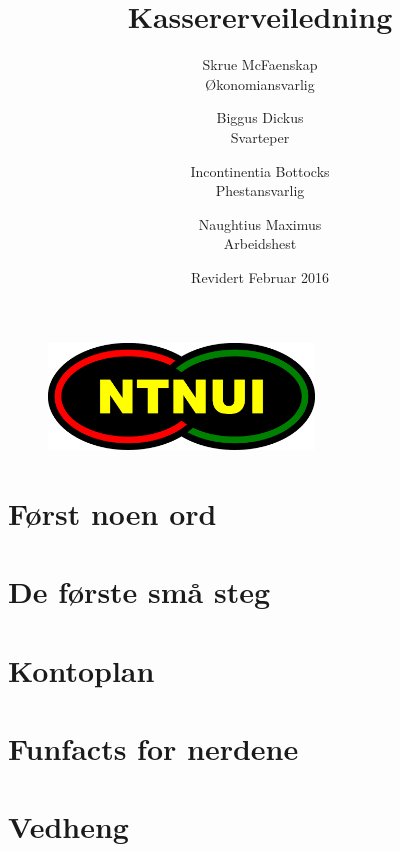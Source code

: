 \documentclass{article}
\title{\huge Kassererveiledning}
\date{Revidert Februar 2016}
\author{Skrue McFaenskap \\ Økonomiansvarlig 
		\and  Biggus Dickus \\ Svarteper
		\and Incontinentia Bottocks \\ Phestansvarlig 
		\and Naughtius Maximus \\ Arbeidshest}
\begin{document}
	\begin{figure}
		\centering
		\includegraphics[keepaspectratio=true, width=200pt]{logo}
	\end{figure}
\maketitle

\tableofcontents
\newpage


\section*{Først noen ord}
	

\section{De første små steg}
	

\newpage
	

\newpage
\section{Kontoplan}
	

\newpage
\section*{Funfacts for nerdene}
%	

\newpage
\section{Vedheng}
	
\end{document}
